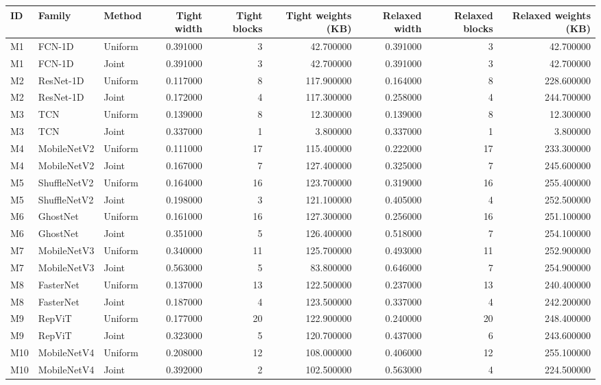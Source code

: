 \begin{tabular}{lllrrrrrr}
\toprule
ID & Family & Method & Tight width & Tight blocks & Tight weights (KB) & Relaxed width & Relaxed blocks & Relaxed weights (KB) \\
\midrule
M1 & FCN-1D & Uniform & 0.391000 & 3 & 42.700000 & 0.391000 & 3 & 42.700000 \\
M1 & FCN-1D & Joint & 0.391000 & 3 & 42.700000 & 0.391000 & 3 & 42.700000 \\
M2 & ResNet-1D & Uniform & 0.117000 & 8 & 117.900000 & 0.164000 & 8 & 228.600000 \\
M2 & ResNet-1D & Joint & 0.172000 & 4 & 117.300000 & 0.258000 & 4 & 244.700000 \\
M3 & TCN & Uniform & 0.139000 & 8 & 12.300000 & 0.139000 & 8 & 12.300000 \\
M3 & TCN & Joint & 0.337000 & 1 & 3.800000 & 0.337000 & 1 & 3.800000 \\
M4 & MobileNetV2 & Uniform & 0.111000 & 17 & 115.400000 & 0.222000 & 17 & 233.300000 \\
M4 & MobileNetV2 & Joint & 0.167000 & 7 & 127.400000 & 0.325000 & 7 & 245.600000 \\
M5 & ShuffleNetV2 & Uniform & 0.164000 & 16 & 123.700000 & 0.319000 & 16 & 255.400000 \\
M5 & ShuffleNetV2 & Joint & 0.198000 & 3 & 121.100000 & 0.405000 & 4 & 252.500000 \\
M6 & GhostNet & Uniform & 0.161000 & 16 & 127.300000 & 0.256000 & 16 & 251.100000 \\
M6 & GhostNet & Joint & 0.351000 & 5 & 126.400000 & 0.518000 & 7 & 254.100000 \\
M7 & MobileNetV3 & Uniform & 0.340000 & 11 & 125.700000 & 0.493000 & 11 & 252.900000 \\
M7 & MobileNetV3 & Joint & 0.563000 & 5 & 83.800000 & 0.646000 & 7 & 254.900000 \\
M8 & FasterNet & Uniform & 0.137000 & 13 & 122.500000 & 0.237000 & 13 & 240.400000 \\
M8 & FasterNet & Joint & 0.187000 & 4 & 123.500000 & 0.337000 & 4 & 242.200000 \\
M9 & RepViT & Uniform & 0.177000 & 20 & 122.900000 & 0.240000 & 20 & 248.400000 \\
M9 & RepViT & Joint & 0.323000 & 5 & 120.700000 & 0.437000 & 6 & 243.600000 \\
M10 & MobileNetV4 & Uniform & 0.208000 & 12 & 108.000000 & 0.406000 & 12 & 255.100000 \\
M10 & MobileNetV4 & Joint & 0.392000 & 2 & 102.500000 & 0.563000 & 4 & 224.500000 \\
\bottomrule
\end{tabular}
